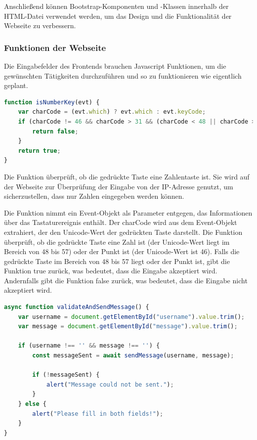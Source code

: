Anschließend können Bootstrap-Komponenten und -Klassen innerhalb der HTML-Datei verwendet werden, um das Design und
die Funktionalität der Webseite zu verbessern.

\subsubsection{Funktionen der Webseite}
Die Eingabefelder des Frontends brauchen Javascript Funktionen, um die gewünschten Tätigkeiten durchzuführen und so zu
funktionieren wie eigentlich geplant.

\begin{lstlisting}[language=JavaScript, caption={Javascript | Überprüfung, ob die Eingabe eine Zahl oder "." ist}]
function isNumberKey(evt) {
    var charCode = (evt.which) ? evt.which : evt.keyCode;
    if (charCode != 46 && charCode > 31 && (charCode < 48 || charCode > 57)) {
        return false;
    }
    return true;
}
\end{lstlisting}

Die Funktion überprüft, ob die gedrückte Taste eine Zahlentaste ist. Sie wird auf der Webseite zur Überprüfung der Eingabe
von der IP-Adresse genutzt, um sicherzustellen, dass nur Zahlen eingegeben werden können.

Die Funktion nimmt ein Event-Objekt als Parameter entgegen, das Informationen über das Tastaturereignis enthält. Der
charCode wird aus dem Event-Objekt extrahiert, der den Unicode-Wert der gedrückten Taste darstellt. Die Funktion überprüft,
ob die gedrückte Taste eine Zahl ist (der Unicode-Wert liegt im Bereich von 48 bis 57) oder der Punkt ist (der Unicode-Wert
ist 46). Falls die gedrückte Taste im Bereich von 48 bis 57 liegt oder der Punkt ist, gibt die Funktion true zurück, was
bedeutet, dass die Eingabe akzeptiert wird. Andernfalls gibt die Funktion false zurück, was bedeutet, dass die Eingabe
nicht akzeptiert wird.

\begin{lstlisting}[language=JavaScript, caption={Javascript | Validierung und Senden der Message}]
async function validateAndSendMessage() {
    var username = document.getElementById("username").value.trim();
    var message = document.getElementById("message").value.trim();

    if (username !== '' && message !== '') {
        const messageSent = await sendMessage(username, message);

        if (!messageSent) {
            alert("Message could not be sent.");
        }
    } else {
        alert("Please fill in both fields!");
    }
}
\end{lstlisting}

